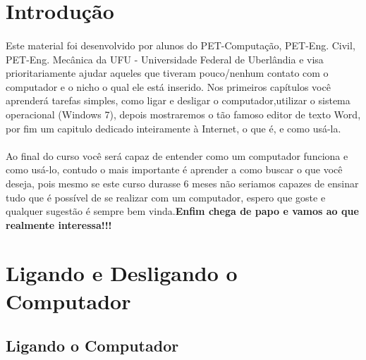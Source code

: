 \documentclass[hidelinks,12pt]{article}
\begin{document}
\pagestyle{fancy}
	
\tableofcontents
\listoffigures

{\let\thefootnote\relax{}}

{\let\thefootnote\relax{}}

\newpage

\section{Introdução}
\paragraph{} Este material foi desenvolvido por alunos do PET-Computação, PET-Eng. Civil, PET-Eng. Mecânica da UFU - Universidade Federal de Uberlândia e visa prioritariamente ajudar aqueles que tiveram pouco/nenhum contato com o computador e o nicho o qual ele
			está inserido. Nos primeiros capítulos você aprenderá tarefas simples, como ligar e desligar o computador,utilizar o sistema operacional (Windows 7), depois mostraremos o tão famoso editor de texto Word, por fim um capitulo dedicado inteiramente à Internet, o que é, e como usá-la.
\paragraph{} Ao final do curso você será capaz de entender como um computador funciona e como usá-lo, contudo o mais importante
			é aprender a como buscar o que você deseja, pois mesmo se este curso durasse 6 meses não seriamos capazes 
			de ensinar tudo que é possível de se realizar com um computador, espero que goste e qualquer sugestão é sempre bem vinda.\textbf{Enfim chega de papo e vamos ao que realmente interessa!!!}

\section{Ligando e Desligando o Computador}
\subsection{Ligando o Computador} 
\end{document}
